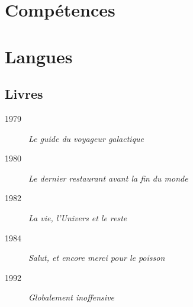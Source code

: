 \documentclass{simpleCV}
\begin{document}
\begin{talents}
  
  \section*{Compétences}

  
  \section*{Langues}

\end{talents}
\begin{experiences}
  
  
  \section*{Livres}

  \begin{description}
  \item[1979] \emph{Le guide du voyageur galactique}
  \item[1980] \emph{Le dernier restaurant avant la fin du monde}
  \item[1982] \emph{La vie, l'Univers et le reste}
  \item[1984] \emph{Salut, et encore merci pour le poisson}
  \item[1992] \emph{Globalement inoffensive}
  \end{description}
\end{experiences}
\end{document}
